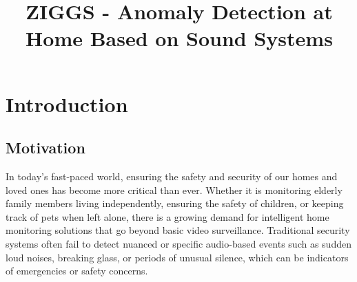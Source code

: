 \documentclass[conference]{IEEEtran}
\begin{document}
\title{ZIGGS - Anomaly Detection at Home Based on Sound Systems}

\author{ 
\and 
{} 
\and 
{} 
\and 
{} 
}
\maketitle



\maketitle

\section{Introduction}
\subsection{Motivation}
In today’s fast-paced world, ensuring the safety and security of our homes and loved ones has become more critical than ever. Whether it is monitoring elderly family members living independently, ensuring the safety of children, or keeping track of pets when left alone, there is a growing demand for intelligent home monitoring solutions that go beyond basic video surveillance. Traditional security systems often fail to detect nuanced or specific audio-based events such as sudden loud noises, breaking glass, or periods of unusual silence, which can be indicators of emergencies or safety concerns.
\end{document}
